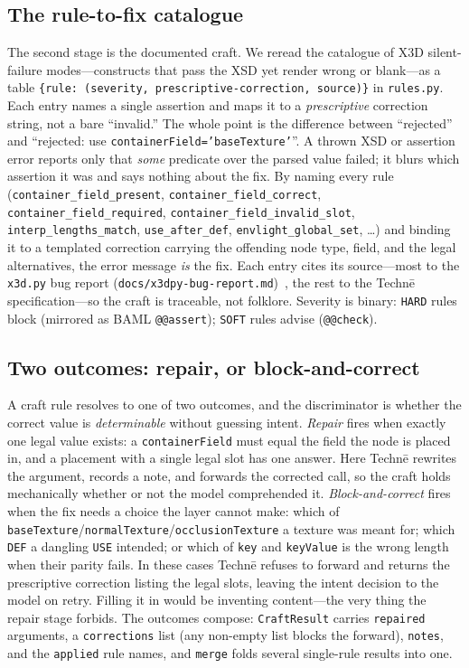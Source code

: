 \documentclass[sigconf,nonacm,screen,anonymous]{acmart}
\begin{document}
\subsection{The rule-to-fix catalogue}
The second stage is the documented craft. We reread the catalogue of X3D silent-failure modes---constructs that pass the XSD yet render wrong or blank---as a table \texttt{\{rule: (severity, prescriptive-correction, source)\}} in \texttt{rules.py}. Each entry names a single assertion and maps it to a \emph{prescriptive} correction string, not a bare ``invalid.'' The whole point is the difference between ``rejected'' and ``rejected: use \texttt{containerField='baseTexture'}''. A thrown XSD or assertion error reports only that \emph{some} predicate over the parsed value failed; it blurs which assertion it was and says nothing about the fix. By naming every rule (\texttt{container\_field\_present}, \texttt{container\_field\_correct}, \texttt{container\_field\_required}, \texttt{container\_field\_invalid\_slot}, \texttt{interp\_lengths\_match}, \texttt{use\_after\_def}, \texttt{envlight\_global\_set}, \ldots) and binding it to a templated correction carrying the offending node type, field, and the legal alternatives, the error message \emph{is} the fix. Each entry cites its source---most to the \texttt{x3d.py} bug report (\texttt{docs/x3dpy-bug-report.md})~\cite{x3dpy}, the rest to the Technē specification---so the craft is traceable, not folklore. Severity is binary: \texttt{HARD} rules block (mirrored as BAML \texttt{@@assert}); \texttt{SOFT} rules advise (\texttt{@@check}).

\subsection{Two outcomes: repair, or block-and-correct}
A craft rule resolves to one of two outcomes, and the discriminator is whether the correct value is \emph{determinable} without guessing intent. \emph{Repair} fires when exactly one legal value exists: a \texttt{containerField} must equal the field the node is placed in, and a placement with a single legal slot has one answer. Here Technē rewrites the argument, records a note, and forwards the corrected call, so the craft holds mechanically whether or not the model comprehended it. \emph{Block-and-correct} fires when the fix needs a choice the layer cannot make: which of \texttt{baseTexture}/\texttt{normalTexture}/\texttt{occlusionTexture} a texture was meant for; which \texttt{DEF} a dangling \texttt{USE} intended; or which of \texttt{key} and \texttt{keyValue} is the wrong length when their parity fails. In these cases Technē refuses to forward and returns the prescriptive correction listing the legal slots, leaving the intent decision to the model on retry. Filling it in would be inventing content---the very thing the repair stage forbids. The outcomes compose: \texttt{CraftResult} carries \texttt{repaired} arguments, a \texttt{corrections} list (any non-empty list blocks the forward), \texttt{notes}, and the \texttt{applied} rule names, and \texttt{merge} folds several single-rule results into one.
\end{document}
